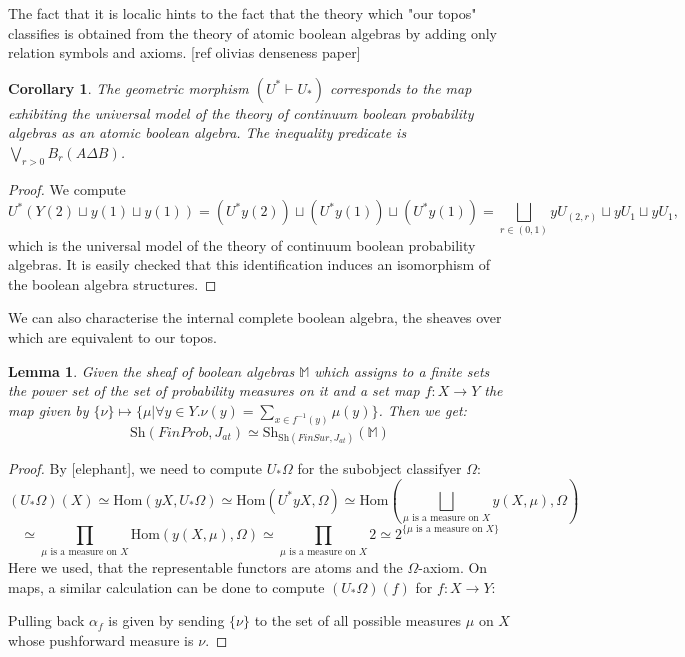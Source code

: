 \documentclass[a4paper]{amsproc}
\theoremstyle{plain}
\newtheorem{lemma}[theorem]{Lemma}
\newtheorem{corollary}[theorem]{Corollary}
\theoremstyle{definition}
\theoremstyle{remark}
\numberwithin{equation}{section}
\begin{document}
The fact that it is localic hints to the fact that the theory which "our topos" classifies is obtained from the theory of atomic boolean algebras by adding only relation symbols and axioms. [ref olivias denseness paper]
\begin{corollary} The geometric morphism $(U^*\vdash U_*)$ corresponds to the map exhibiting the universal model of the theory of continuum boolean probability algebras as an atomic boolean algebra. The inequality predicate is $\bigvee_{r>0} B_r ( A\Delta B )$.%
\end{corollary}
\begin{proof} We compute 
\[U^*(Y(2)\sqcup y(1) \sqcup y(1))= (U^*y(2))\sqcup (U^*y(1))\sqcup (U^*y(1))=\bigsqcup_{r\in (0,1)}yU_{(2,r)}\sqcup yU_1 \sqcup yU_1, \] which is the universal model of the theory of continuum boolean probability algebras. It is easily checked that this identification induces an isomorphism of the boolean algebra structures.
\end{proof}%
We can also characterise the internal complete boolean algebra, the sheaves over which are equivalent to our topos.
\begin{lemma} Given the sheaf of boolean algebras $\mathbb{M}$ which assigns to a finite sets the power set of the set of probability measures on it and a set map $f:X\rightarrow Y$ the map given by $\{\nu \}\mapsto \{\mu| \forall y\in Y. \nu(y)=\sum_{x\in f^{-1}(y)}\mu(y)  \}$. Then we get:
\[\text{Sh}(FinProb,J_{at})\simeq \text{Sh}_{\text{Sh}(FinSur,J_{at})}(\mathbb{M}) \]
\end{lemma}
\begin{proof} By [elephant], we need to compute $U_*\Omega$ for the subobject classifyer $\Omega$:
\[(U_*\Omega)(X)\simeq \text{Hom}(yX,U_*\Omega)\simeq \text{Hom}(U^*yX,\Omega)\simeq \text{Hom}(\bigsqcup_{\mu \text{ is a measure on }X}y(X,\mu),\Omega)\]
\[\simeq \prod_{\mu \text{ is a measure on }X}\text{Hom}(y(X,\mu),\Omega)\simeq \prod_{\mu \text{ is a measure on }X} 2\simeq 2^{\{\mu \text{ is a measure on }X\} } 
 \]
 Here we used, that the representable functors are atoms and the $\Omega$-axiom.
 On maps, a similar calculation can be done to compute $(U_*\Omega)(f)$ for $f:X\rightarrow Y$:
 \begin{center}
\end{center}
Pulling back $\alpha_f$ is given by sending $\{\nu\}$ to the set of all possible measures $\mu$ on $X$ whose pushforward measure is $\nu$.  
\end{proof} 
\end{document}
